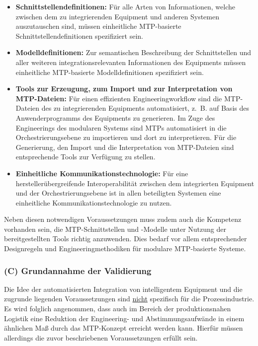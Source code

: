 \begin{itemize}
	\item[(1)] \textbf{Schnittstellendefinitionen:} Für alle Arten von Informationen, welche zwischen dem zu integrierenden Equipment und anderen Systemen auszutauschen sind, müssen einheitliche MTP-basierte Schnittstellendefinitionen spezifiziert sein.
	\item[(2)] \textbf{Modelldefinitionen:} Zur semantischen Beschreibung der Schnittstellen und aller weiteren integrationsrelevanten Informationen des Equipments müssen einheitliche MTP-basierte Modelldefinitionen spezifiziert sein.
	\item[(3)] \textbf{Tools zur Erzeugung, zum Import und zur Interpretation von MTP-Dateien:} Für einen effizienten Engineeringworkflow sind die MTP-Dateien des zu integrierenden Equipments automatisiert, z.~B. auf Basis des Anwenderprogramms des Equipments zu generieren. Im Zuge des Engineerings des modularen Systems sind MTPs automatisiert in die Orchestrierungsebene zu importieren und dort zu interpretieren. Für die Generierung, den Import und die Interpretation von MTP-Dateien sind entsprechende Tools zur Verfügung zu stellen.
	\item[(4)] \textbf{Einheitliche Kommunikationstechnologie:} Für eine her\-stel\-ler\-über\-grei\-fen\-de Interoperabilität zwischen dem integrierten Equipment und der Orchestrierungsebene ist in allen beteiligten Systemen eine einheitliche Kommunikationstechnologie zu nutzen.
\end{itemize}

Neben diesen notwendigen Voraussetzungen muss zudem auch die Kompetenz vorhanden sein, die MTP-Schnittstellen und -Modelle unter Nutzung der bereitgestellten Tools richtig anzuwenden. Dies bedarf vor allem entsprechender Designregeln und Engineeringmethodiken für modulare MTP-basierte Systeme.

\subsubsection{(C) Grundannahme der Validierung}

Die Idee der automatisierten Integration von intelligentem Equipment und die zugrunde liegenden Voraussetzungen sind \underline{nicht} spezifisch für die Prozessindustrie. Es wird folglich angenommen, dass auch im Bereich der produktionsnahen Logistik eine Reduktion der Engineering- und Abstimmungsaufwände in einem ähnlichen Maß durch das MTP-Konzept erreicht werden kann. Hierfür müssen allerdings die zuvor beschriebenen Voraussetzungen erfüllt sein.

